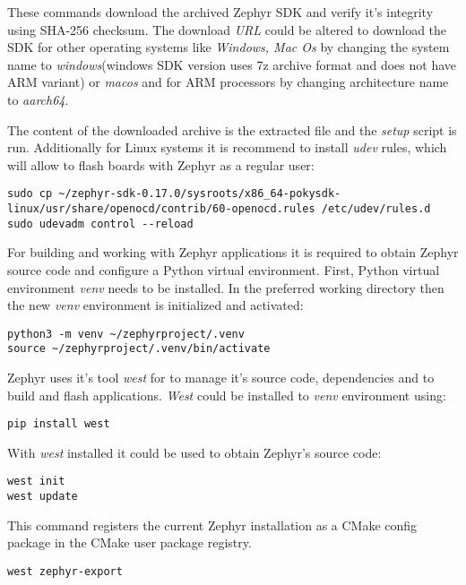 \documentclass[twoside, 12pt]{article}
\begin{document}
These commands download the archived Zephyr SDK and verify it's integrity using SHA-256 
checksum. The download \textit{URL} could be altered to download the SDK for other operating 
systems like \textit{Windows, Mac Os} by changing the system name to \textit{windows}(windows 
SDK version uses 7z archive format and does not have ARM variant) or \textit{macos} and for 
ARM processors by changing architecture name to \textit{aarch64}.

The content of the downloaded archive is the extracted file and the \textit{ setup} script is 
run. Additionally for Linux systems it is recommend to install \textit{udev} rules, which 
will allow to flash boards with Zephyr as a regular user:
\begin{lstlisting}[caption=Installing udev rules,breaklines=true]
sudo cp ~/zephyr-sdk-0.17.0/sysroots/x86_64-pokysdk-linux/usr/share/openocd/contrib/60-openocd.rules /etc/udev/rules.d
sudo udevadm control --reload
\end{lstlisting}

For building and working with Zephyr applications it is required to obtain Zephyr source code 
and configure a Python virtual environment. First, Python virtual environment \textit{venv} 
needs to be installed. In the preferred working directory then the new \textit{venv} 
environment is initialized and activated:
\begin{lstlisting}[caption=Creating and activating Python venv environment]
python3 -m venv ~/zephyrproject/.venv
source ~/zephyrproject/.venv/bin/activate
\end{lstlisting}

Zephyr uses it's tool \textit{west} for to manage it's source code, dependencies and to build 
and flash applications. \textit{West} could be installed to \textit{venv} environment using:
\begin{lstlisting}[caption=Installing Zephyr's West tool]
pip install west
\end{lstlisting}

With \textit{west} installed it could be used to obtain Zephyr's source code:
\newpage
\begin{lstlisting}[caption=Obtaining Zephyr's source code]
west init
west update
\end{lstlisting}

This command registers the current Zephyr installation as a CMake config package in the CMake user package registry.\cite{zephyr_cmake_commands}
\begin{lstlisting}
west zephyr-export
\end{lstlisting}
\end{document}
